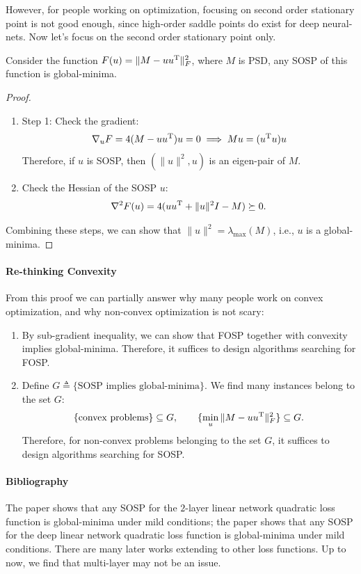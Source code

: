 However, for people working on optimization, focusing on second order stationary point is not good enough, since high-order saddle points do exist for deep neural-nets.
Now let's focus on the second order stationary point only.

\begin{proposition}
Consider the function $F(u) = \|M - uu^{\mathrm T}\|_F^2$, where $M$ is PSD, any SOSP of this function is global-minima.
\end{proposition}
\begin{proof}
\begin{enumerate}
\item
Step 1: Check the gradient:
\[
\nabla_u F = 4(M - uu^{\mathrm T})u=0\implies Mu = (u^{\mathrm T} u)u
\]
Therefore, if $u$ is SOSP, then $(\|u\|^2,u)$ is an eigen-pair of $M$.
\item
Check the Hessian of the SOSP $u$:
\[
\nabla^2F(u)=4(uu^{\mathrm T} + \|u\|^2I-M)\succeq0.
\]
\end{enumerate}
Combining these steps, we can show that $\|u\|^2=\lambda_{\max}(M)$, i.e., $u$ is a global-minima.
\end{proof}


\paragraph{Re-thinking Convexity}
From this proof we can partially answer why many people work on convex optimization, and why non-convex optimization is not scary:
\begin{enumerate}
\item
By sub-gradient inequality, we can show that FOSP together with convexity implies global-minima.
Therefore, it suffices to design algorithms searching for FOSP.
\item
Define $G\triangleq\{\text{SOSP implies global-minima}\}$. We find many instances belong to the set $G$:
\[
\{\text{convex problems}\}\subseteq G,\qquad
\{\min_{u}\|M - uu^{\mathrm T}\|_F^2\}\subseteq G.
\] 
Therefore, for non-convex problems belonging to the set $G$, it suffices to design algorithms searching for SOSP.
\end{enumerate}

\paragraph{Bibliography}
The paper \citep{BALDI198953} shows that any SOSP for the $2$-layer linear network quadratic loss function is global-minima under mild conditions;
the paper \citep{NIPS2016_6112} shows that any SOSP for the deep linear network quadratic loss function is global-minima under mild conditions.
There are many later works extending to other loss functions.
Up to now, we find that multi-layer may not be an issue.

